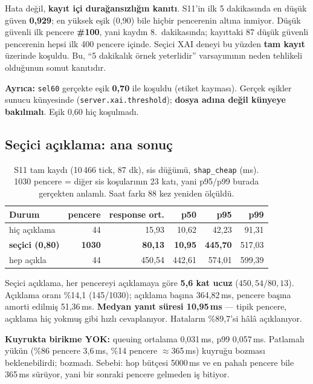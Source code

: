 \documentclass[11pt,a4paper]{article}
\newcommand{\ms}{\,ms}
\newcommand{\kod}[1]{\texttt{\small #1}}
\newcommand{\dosya}[1]{\texttt{\footnotesize #1}}
\begin{document}
\begin{uyari}
Hata değil, \textbf{kayıt içi durağansızlığın kanıtı}. S11'in ilk 5
dakikasında en düşük güven \textbf{0{,}929}; en yüksek eşik (0{,}90) bile
hiçbir pencerenin altına inmiyor. Düşük güvenli ilk pencere \textbf{\#100},
yani kaydın 8.\ dakikasında; kayıttaki 87 düşük güvenli pencerenin hepsi ilk
400 pencere içinde. Seçici XAI deneyi bu yüzden \textbf{tam kayıt} üzerinde
koşuldu. Bu, ``5 dakikalık örnek yeterlidir'' varsayımının neden tehlikeli
olduğunun somut kanıtıdır.

\textbf{Ayrıca:} \dosya{sel60} gerçekte eşik \textbf{0{,}70} ile koşuldu
(etiket kayması). Gerçek eşikler sunucu künyesinde
(\kod{server.xai.threshold}); \textbf{dosya adına değil künyeye bakılmalı}.
Eşik 0{,}60 hiç koşulmadı.
\end{uyari}

\subsection{Seçici açıklama: ana sonuç}

\begin{table}[H]
\centering\small
\begin{tabular}{@{}lrrrrr@{}}
\toprule
\textbf{Durum} & \textbf{pencere} & \textbf{response ort.} & \textbf{p50} & \textbf{p95} & \textbf{p99} \\
\midrule
hiç açıklama                      & 44 & 15{,}93 & 10{,}62 & 42{,}23 & 91{,}31 \\
\textbf{seçici (0{,}80)}          & \textbf{1030} & \textbf{80{,}13} & \textbf{10{,}95} & \textbf{445{,}70} & 517{,}03 \\
hep açıkla                        & 44 & 450{,}54 & 442{,}61 & 574{,}01 & 599{,}39 \\
\bottomrule
\end{tabular}
\caption{S11 tam kaydı (10\,466 tick, 87 dk), sis düğümü, \kod{shap\_cheap}
(ms). 1030 pencere = diğer sis koşularının 23 katı, yani p95/p99 burada
gerçekten anlamlı. Saat farkı 88 kez yeniden ölçüldü.}
\end{table}

\begin{bulgu}
Seçici açıklama, her pencereyi açıklamaya göre \textbf{5{,}6 kat ucuz}
($450{,}54 / 80{,}13$). Açıklama oranı \%14{,}1 (145/1030); açıklama başına
364{,}82\ms, pencere başına amorti edilmiş 51{,}36\ms. \textbf{Medyan yanıt
süresi 10{,}95\ms} --- tipik pencere, açıklama hiç yokmuş gibi hızlı
cevaplanıyor. Hataların \%89{,}7'si hâlâ açıklanıyor.

\textbf{Kuyrukta birikme YOK:} queuing ortalama 0{,}031\ms, p99 0{,}057\ms.
Patlamalı yükün (\%86 pencere 3{,}6\ms, \%14 pencere $\approx$365\ms) kuyruğu
bozması beklenebilirdi; bozmadı. Sebebi: hop bütçesi 5000\ms{} ve en pahalı
pencere bile 365\ms{} sürüyor, yani bir sonraki pencere gelmeden iş bitiyor.
\end{bulgu}
\end{document}
